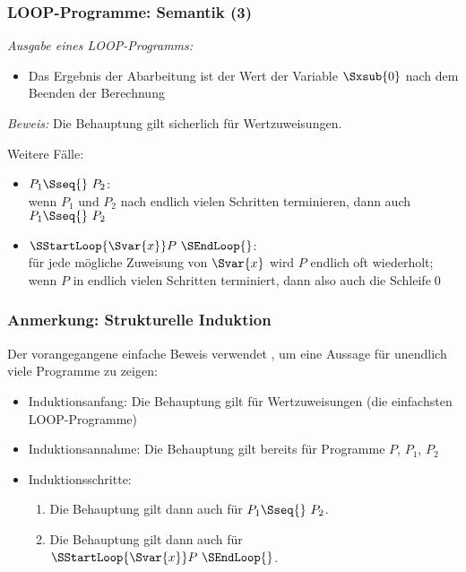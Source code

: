 \documentclass[aspectratio=1610,onlymath]{beamer}
\begin{document}
\begin{frame}\frametitle{LOOP-Programme: Semantik (3)}

\emph{Ausgabe eines LOOP-Programms:}\\
\begin{itemize}
\item Das Ergebnis der Abarbeitung ist der Wert der Variable $\Sxsub{0}$ nach dem Beenden der Berechnung
\end{itemize}
\bigskip\pause


\pause
\emph{Beweis:} Die Behauptung gilt sicherlich für Wertzuweisungen.
\bigskip

Weitere Fälle:
\begin{itemize}
\item $P_1\Sseq{}~P_2$:\\
	wenn $P_1$ und $P_2$ nach endlich vielen Schritten terminieren, dann auch $P_1\Sseq{}~P_2$
\item $\SStartLoop{\Svar{x}}P~\SEndLoop{}$:\\
	für jede mögliche Zuweisung von $\Svar{x}$ wird $P$ endlich oft wiederholt;
	wenn $P$ in endlich vielen Schritten terminiert, dann also auch die Schleife\qed
\end{itemize}

\end{frame}

\begin{frame}\frametitle{Anmerkung: Strukturelle Induktion}

Der vorangegangene einfache Beweis verwendet , um eine
Aussage für unendlich viele Programme zu zeigen:
\begin{itemize}
\item \alert{Induktionsanfang:} Die Behauptung gilt für Wertzuweisungen (die einfachsten LOOP-Programme)
\item \alert{Induktionsannahme:} Die Behauptung gilt bereits für Programme $P$, $P_1$, $P_2$
\item \alert{Induktionsschritte:}
\begin{enumerate}[(1)]
\item Die Behauptung gilt dann auch für $P_1\Sseq{}~P_2$.
\item Die Behauptung gilt dann auch für $\SStartLoop{\Svar{x}}P~\SEndLoop{}$.
\end{enumerate}
\end{itemize}
\bigskip


\end{frame}
\end{document}
